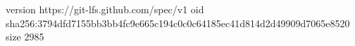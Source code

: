 version https://git-lfs.github.com/spec/v1
oid sha256:3794dfd7155bb3bb4fc9e665c194c0c0c64185ec41d814d2d49909d7065e8520
size 2985
